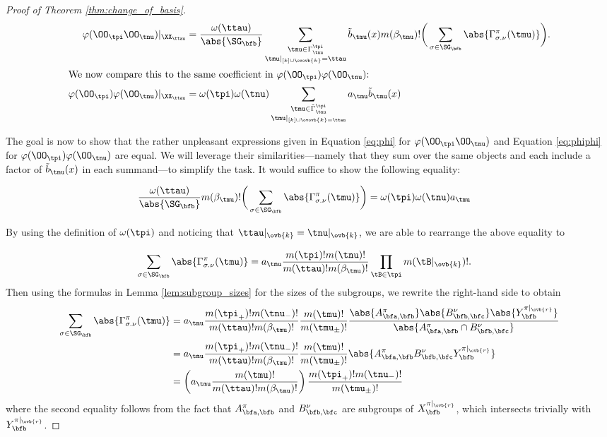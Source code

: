 \begin{proof}[Proof of Theorem \ref{thm:change_of_basis}]
\begin{align}
        \varphi(\OO_\tpi\OO_\tnu)|_{\XX_\ttau}&=\frac{\omega(\ttau)}{\abs{\SG_\bfb}}\sum_{\substack{\tmu\in\Gamma^\tpi_\tnu\\\tmu|_{[k]\cup\ovovb{k}}=\ttau}}\tilde{b}_\tmu(x)m(\beta_\tmu)!\bigg(\sum_{\sigma\in\SG_\bfb}\abs{\Gamma^\pi_{\sigma.\nu}(\tmu)}\bigg).\label{eq:phi}\\
        \intertext{We now compare this to the same coefficient in $\varphi(\OO_\tpi)\varphi(\OO_\tnu)$:}
        \varphi(\OO_\tpi)\varphi(\OO_\tnu)|_{\XX_\ttau}&=\omega(\tpi)\omega(\tnu)\sum_{\substack{\tmu\in\tilde\Gamma^\tpi_\tnu\\\tmu|_{[k]\cup\ovovb{k}=\ttau}}}a_\tmu \tilde{b}_\tmu(x)\label{eq:phiphi}
    \end{align}

    The goal is now to show that the rather unpleasant expressions given in Equation \ref{eq:phi} for $\varphi(\OO_\tpi\OO_\tnu)$ and Equation \ref{eq:phiphi} for $\varphi(\OO_\tpi)\varphi(\OO_\tnu)$ are equal. We will leverage their similarities---namely that they sum over the same objects and each include a factor of $\tilde{b}_\tmu(x)$ in each summand---to simplify the task. It would suffice to show the following equality:

    \begin{align*}
        \frac{\omega(\ttau)}{\abs{\SG_\bfb}}m(\beta_\tmu)!\bigg(\sum_{\sigma\in\SG_\bfb}\abs{\Gamma^\pi_{\sigma.\nu}(\tmu)}\bigg)&=\omega(\tpi)\omega(\tnu)a_\tmu
    \end{align*}

    By using the definition of $\omega(\tpi)$ and noticing that $\ttau|_{\ovb{k}}=\tnu|_{\ovb{k}}$, we are able to rearrange the above equality to

    \begin{align*}
        \sum_{\sigma\in\SG_\bfb}\abs{\Gamma^\pi_{\sigma.\nu}(\tmu)}&=a_\tmu\frac{m(\tpi)!m(\tnu)!}{m(\ttau)!m(\beta_\tmu)!}\prod_{\tB\in\tpi}m(\tB|_{\ovb{k}})!.
    \end{align*}
    Then using the formulas in Lemma \ref{lem:subgroup_sizes} for the sizes of the subgroups, we rewrite the right-hand side to obtain
    \begin{align*}
        \sum_{\sigma\in\SG_\bfb}\abs{\Gamma^\pi_{\sigma.\nu}(\tmu)}&=a_\tmu\frac{m(\tpi_+)!m(\tnu_-)!}{m(\ttau)!m(\beta_\tmu)!}\frac{m(\tmu)!}{m(\tmu_\pm)!}\frac{\abs{A^\pi_{\bfa,\bfb}}\abs{B^\nu_{\bfb,\bfc}}\abs{Y_\bfb^{\pi|_{\ovb{r}}}}}{\abs{A_{\bfa,\bfb}^\pi\cap B_{\bfb,\bfc}^\nu}}\\
        &=a_\tmu\frac{m(\tpi_+)!m(\tnu_-)!}{m(\ttau)!m(\beta_\tmu)!}\frac{m(\tmu)!}{m(\tmu_\pm)!}\abs{A_{\bfa,\bfb}^\pi B_{\bfb,\bfc}^\nu Y_\bfb^{\pi|_{\ovb{r}}}}\\
        &=\left(a_\tmu\frac{m(\tmu)!}{m(\ttau)!m(\beta_\tmu)!}\right)\frac{m(\tpi_+)!m(\tnu_-)!}{m(\tmu_\pm)!}
    \end{align*} where the second equality follows from the fact that $A_{\bfa,\bfb}^\pi$ and $B_{\bfb,\bfc}^\nu$ are subgroups of $X_\bfb^{\pi|_{\ovb{r}}}$, which intersects trivially with $Y_\bfb^{\pi|_{\ovb{r}}}$.
    

\end{proof}
